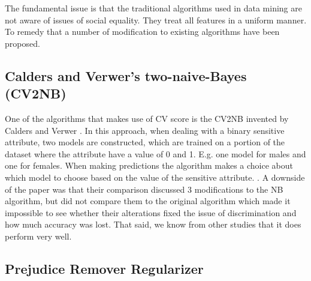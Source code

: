 \documentclass[a4paper, 12pt, notitlepage]{article}
\begin{document}
The fundamental issue is that the traditional algorithms used in data mining are not aware of issues of social equality. They treat all features in a uniform manner. To remedy that a number of modification to existing algorithms have been proposed.

\subsection*{Calders and Verwer's two-naive-Bayes (CV2NB)}

One of the algorithms that makes use of CV score is the CV2NB invented by Calders and Verwer \cite{calders2010}. In this approach, when dealing with a binary sensitive attribute, two models are constructed, which are trained on a portion of the dataset where the attribute have a value of 0 and 1. E.g. one model for males and one for females. When making predictions the algorithm makes a choice about which model to choose based on the value of the sensitive attribute. \cite[p.~283]{calders2010}. A downside of the paper was that their comparison discussed 3 modifications to the NB algorithm, but did not compare them to the original algorithm which made it impossible to see whether their alterations fixed the issue of discrimination and how much accuracy was lost. That said, we know from other studies that it does perform very well. \cite[p.~855]{kamishima2013} \cite[p.~44]{kamishima2012b}




\subsection*{Prejudice Remover Regularizer}
\end{document}
